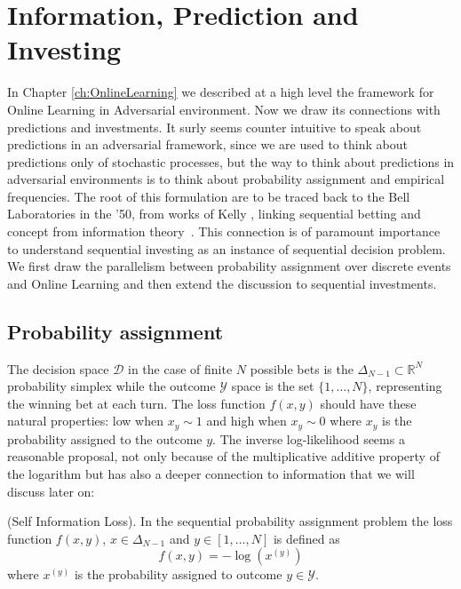 \chapter{Information, Prediction and Investing}

In Chapter \ref{ch:OnlineLearning} we described at a high level the framework for Online Learning in Adversarial environment. Now we draw its connections with predictions and investments. It surly seems counter intuitive to speak about predictions in an adversarial framework, since we are used to think about predictions only of stochastic processes, but the way to think about predictions in adversarial environments is to think about probability assignment and empirical frequencies. The root of this formulation are to be traced back to the Bell Laboratories in the '50, from works of Kelly \cite{kelly2011new}, linking sequential betting and concept from information theory~\cite{cover2012elements}. This connection is of paramount importance to understand sequential investing as an instance of sequential decision problem.
We first draw the parallelism between probability assignment over discrete events and Online Learning and then extend the discussion to sequential investments.

\section{Probability assignment}
The decision space $\mathcal D$ in the case of finite $N$ possible bets is the $\Delta_{N-1}\subset \mathbb R^{N}$ probability simplex while the outcome $\mathcal Y$ space is the set $\{1,\ldots,N\}$, representing the winning bet at each turn. The loss function $f(x,y)$ should have these natural properties: low when $x_y\sim1$ and high when $x_y\sim0$ where $x_y$ is the probability assigned to the outcome $y$. The inverse log-likelihood seems a reasonable proposal, not only because of the multiplicative additive property of the logarithm but has also a deeper connection to information that we will discuss later on:

\begin{definition}(Self Information Loss).
    In the sequential probability assignment problem the loss function $f(x,y)$, $x\in \Delta_{N-1}$ and $y\in[1,\ldots,N]$ is defined as
    $$f(x,y)=-\log\left(x^{(y)}\right)$$
where $x^{(y)}$ is the probability assigned to outcome $y\in\mathcal Y$.
\end{definition}

